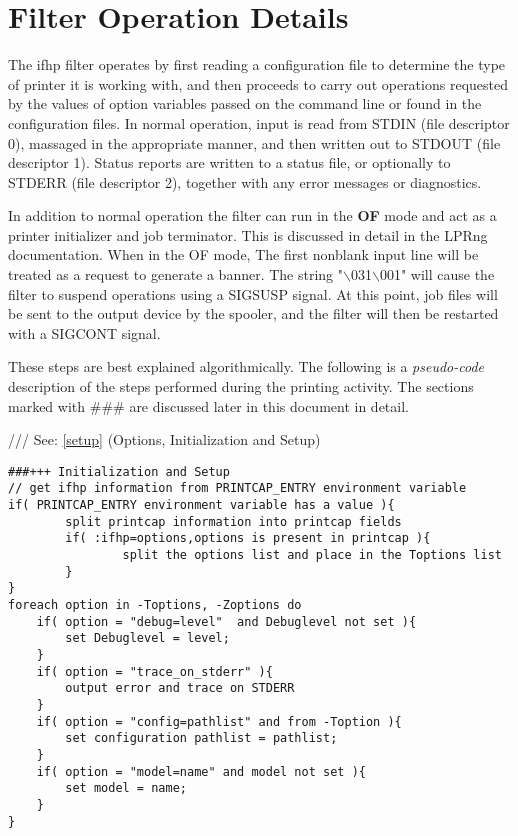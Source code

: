 \documentclass[a4paper]{article}
\begin{document}
\section{Filter Operation Details}

The
{\ttfamily ifhp}
filter operates by first reading a configuration file
to determine the type of printer it is working with,
and then proceeds to carry out operations requested by the values of
option variables passed on the command line or found in the configuration
files.
In normal operation,
input is read from 
{\ttfamily STDIN}
(file descriptor 0),
massaged in the appropriate manner,
and then written out to
{\ttfamily STDOUT} (file descriptor 1).
Status reports are written to
a status file, or optionally to
{\ttfamily STDERR} (file descriptor 2),
together with any error messages or diagnostics.

In addition to normal operation
the filter can run in the
{\bfseries OF} mode and act as a printer initializer and job terminator.
This is discussed in detail in the LPRng documentation.
When in the OF mode,
The first nonblank input line will be treated as
a request to generate a banner.
The string "$\backslash$031$\backslash$001" will cause the filter to suspend operations
using a SIGSUSP signal.
At this point,
job files will be sent to the output device by the spooler,
and the filter will then be restarted with a SIGCONT signal.

These steps are best explained algorithmically.
The following is a {\itshape pseudo-code\/} description of the steps
performed during the printing activity.
The sections marked with {\ttfamily \#\#\#} are discussed later in this document
in detail.

{\ttfamily ///} See: \ref{setup} {(Options, Initialization and Setup)}
\begin{tscreen}
\begin{verbatim}
###+++ Initialization and Setup
// get ifhp information from PRINTCAP_ENTRY environment variable
if( PRINTCAP_ENTRY environment variable has a value ){
        split printcap information into printcap fields
        if( :ifhp=options,options is present in printcap ){
                split the options list and place in the Toptions list
        }
}
foreach option in -Toptions, -Zoptions do
    if( option = "debug=level"  and Debuglevel not set ){
        set Debuglevel = level;
    }
    if( option = "trace_on_stderr" ){
        output error and trace on STDERR
    }
    if( option = "config=pathlist" and from -Toption ){
        set configuration pathlist = pathlist;
    }
    if( option = "model=name" and model not set ){
        set model = name;
    }
}
\end{verbatim}
\end{tscreen}
\end{document}
